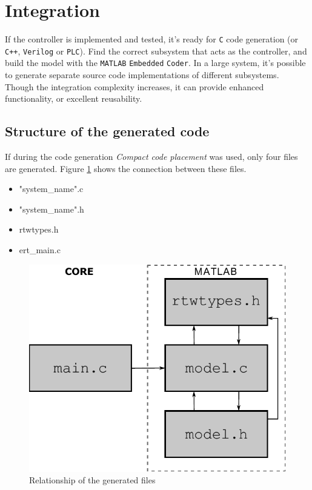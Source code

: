 \section{Integration}
\label{sec:integration}

If the controller is implemented and tested, it's ready for \verb!C! code generation (or \verb!C++!, \verb!Verilog! or \verb!PLC!). Find the correct subsystem that acts as the controller, and build the model with the \verb!MATLAB! \texttt{Embedded} \verb!Coder!. In a large system, it's possible to generate separate source code implementations of different subsystems. Though the integration complexity increases, it can provide enhanced functionality, or excellent reusability.

\subsection{Structure of the generated code}

If during the code generation \emph{Compact code placement} was used, only four files are generated. Figure \ref{fig:rtw} shows the connection between these files. 

\begin{minipage}{0.45\linewidth}
	\begin{itemize}
		\item "system\_name".c
		\item "system\_name".h
		\item rtwtypes.h
		\item ert\_main.c
	\end{itemize}
\end{minipage}
\begin{minipage}{0.45\linewidth}
	\begin{figure}[H]
		\centering
		\includegraphics[width=0.8\linewidth]{img/rtw}
		\caption{Relationship of the generated files}
		\label{fig:rtw}
		\vspace{10pt}
	\end{figure}
\end{minipage}


